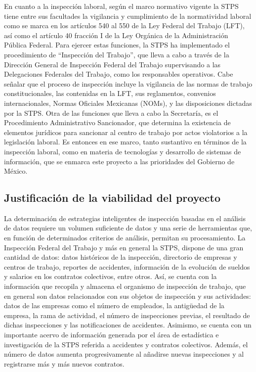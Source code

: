 \documentclass[
]{article}
\begin{document}
En cuanto a la inspección laboral, según el marco normativo vigente la STPS tiene entre sus facultades la vigilancia y cumplimiento de la normatividad laboral como se marca en los artículos 540 al 550 de la Ley Federal del Trabajo (LFT), así como el artículo 40 fracción I de la Ley Orgánica de la Administración Pública Federal. Para ejercer estas funciones, la STPS ha implementado el procedimiento de ``Inspección del Trabajo'', que lleva a cabo a través de la Dirección General de Inspección Federal del Trabajo supervisando a las Delegaciones Federales del Trabajo, como los responsables operativos.
Cabe señalar que el proceso de inspección incluye la vigilancia de las normas de trabajo constitucionales, las contenidas en la LFT, sus reglamentos, convenios internacionales, Normas Oficiales Mexicanas (NOMs), y las disposiciones dictadas por la STPS. Otra de las funciones que lleva a cabo la Secretaría, es el Procedimiento Administrativo Sancionador, que determina la existencia de elementos jurídicos para sancionar al centro de trabajo por actos violatorios a la legislación laboral.
Es entonces en ese marco, tanto sustantivo en términos de la inspección laboral, como en materia de tecnologías y desarrollo de sistemas de información, que se enmarca este proyecto a las prioridades del Gobierno de México.

\hypertarget{introjustificacion}{%
\subsection{Justificación de la viabilidad del proyecto}\label{introjustificacion}}

La determinación de estrategias inteligentes de inspección basadas en el análisis de datos requiere un volumen suficiente de datos y una serie de herramientas que, en función de determinados criterios de análisis, permitan su procesamiento. La Inspección Federal del Trabajo y más en general la STPS, dispone de una gran cantidad de datos: datos históricos de la inspección, directorio de empresas y centros de trabajo, reportes de accidentes, información de la evolución de sueldos y salarios en los contratos colectivos, entre otros. Así, se cuenta con la información que recopila y almacena el organismo de inspección de trabajo, que en general son datos relacionados con sus objetos de inspección y sus actividades: datos de las empresas como el número de empleados, la antigüedad de la empresa, la rama de actividad, el número de inspecciones previas, el resultado de dichas inspecciones y las notificaciones de accidentes. Asimismo, se cuenta con un importante acervo de información generada por el área de estadística e investigación de la STPS referida a accidentes y contratos colectivos. Además, el número de datos aumenta progresivamente al añadirse nuevas inspecciones y al registrarse más y más nuevos contratos.
\end{document}
